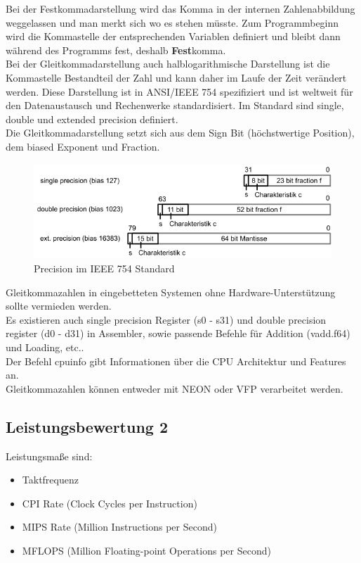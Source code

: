 \documentclass[a4paper,12pt,leqno]{article}
\begin{document}
Bei der Festkommadarstellung wird das Komma in der internen Zahlenabbildung weggelassen und man merkt sich wo es stehen müsste. Zum Programmbeginn wird die Kommastelle der entsprechenden Variablen definiert und bleibt dann während des Programms fest, deshalb \textbf{Fest}komma.\\

Bei der Gleitkommadarstellung auch halblogarithmische Darstellung ist die Kommastelle Bestandteil der Zahl und kann daher im Laufe der Zeit verändert werden. Diese Darstellung ist in ANSI/IEEE 754 spezifiziert und ist weltweit für den Datenaustausch und Rechenwerke standardisiert. Im Standard sind single, double und extended precision definiert.\\

Die Gleitkommadarstellung setzt sich aus dem Sign Bit (höchstwertige Position), dem biased Exponent und Fraction. 

\begin{figure}[h!]
\centering
\includegraphics[scale=0.6]{Grafiken/IEEE754.png}
\caption{Precision im IEEE 754 Standard}
\end{figure}

Gleitkommazahlen in eingebetteten Systemen ohne Hardware-Unterstützung sollte vermieden werden.\\
Es existieren auch single precision Register (s0 - s31) und double precision register (d0 - d31) in Assembler, sowie passende Befehle für Addition (vadd.f64) und Loading, etc..\\
Der Befehl cpuinfo gibt Informationen über die CPU Architektur und Features an.\\

Gleitkommazahlen können entweder mit NEON oder VFP verarbeitet werden.

\subsection{Leistungsbewertung 2}

Leistungsmaße sind:
\begin{itemize}
\item Taktfrequenz
\item CPI Rate (Clock Cycles per Instruction)
\item MIPS Rate (Million Instructions per Second)
\item MFLOPS (Million Floating-point Operations per Second)
\end{itemize}
\end{document}
